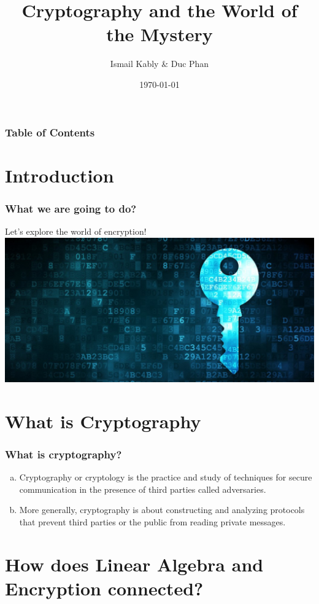 \documentclass[11pt]{beamer}
\title{	Cryptography and the World of the Mystery }
\author{Ismail Kably \& Duc Phan}
\date{\today}
\begin{document}
\begin{frame}
	
	\titlepage
	
\end{frame}

\begin{frame}\frametitle{Table of Contents}
	
	\tableofcontents
	
\end{frame}

\section{Introduction}

\begin{frame}\frametitle{What we are going to do?}
	
\center Let's explore the world of encryption!
\center \includegraphics[scale=0.2]{encryption.png}
\end{frame}

\section{What is Cryptography}
\begin{frame}\frametitle{What is cryptography?}
	\begin{enumerate}[a.]
	\item Cryptography or cryptology is the practice and study of techniques for secure communication in the presence of third parties called adversaries.
	\item More generally, cryptography is about constructing and analyzing protocols that prevent third parties or the public from reading private messages.
	\end{enumerate}
\end{frame}

\section{How does Linear Algebra and Encryption connected?}
\end{document}

